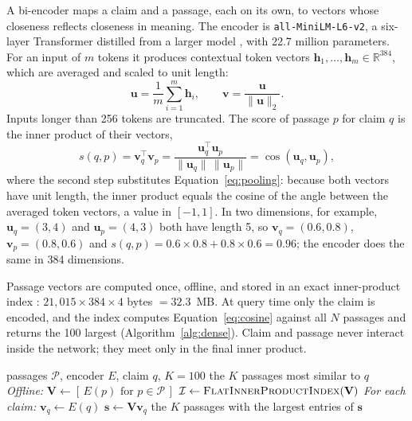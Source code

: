 A bi-encoder \parencite{reimers2019sbert} maps a claim and a passage, each on its own, to
vectors whose closeness reflects closeness in meaning. The encoder is \texttt{all-MiniLM-L6-v2},
a six-layer Transformer \parencite{vaswani2017attention} distilled from a larger model
\parencite{wang2020minilm}, with 22.7 million parameters. For an input of $m$ tokens it produces
contextual token vectors $\mathbf{h}_1, \dots, \mathbf{h}_m \in \mathbb{R}^{384}$, which are
averaged and scaled to unit length:
\begin{equation}
\mathbf{u} = \frac{1}{m} \sum_{i=1}^{m} \mathbf{h}_i,
\qquad
\mathbf{v} = \frac{\mathbf{u}}{\lVert \mathbf{u} \rVert_2}.
\label{eq:pooling}
\end{equation}
Inputs longer than 256 tokens are truncated. The score of passage $p$ for claim $q$ is the
inner product of their vectors,
\begin{equation}
s(q, p) = \mathbf{v}_q^{\top} \mathbf{v}_p
= \frac{\mathbf{u}_q^{\top} \mathbf{u}_p}{\lVert \mathbf{u}_q \rVert \, \lVert \mathbf{u}_p \rVert}
= \cos(\mathbf{u}_q, \mathbf{u}_p),
\label{eq:cosine}
\end{equation}
where the second step substitutes Equation~\eqref{eq:pooling}: because both vectors have unit
length, the inner product equals the cosine of the angle between the averaged token vectors, a
value in $[-1, 1]$. In two dimensions, for example, $\mathbf{u}_q = (3, 4)$ and
$\mathbf{u}_p = (4, 3)$ both have length 5, so $\mathbf{v}_q = (0.6, 0.8)$,
$\mathbf{v}_p = (0.8, 0.6)$ and $s(q, p) = 0.6 \times 0.8 + 0.8 \times 0.6 = 0.96$; the encoder
does the same in 384 dimensions.

Passage vectors are computed once, offline, and stored in an exact inner-product index
\parencite{johnson2021faiss}: $21{,}015 \times 384 \times 4$ bytes $= 32.3$~MB. At query time only
the claim is encoded, and the index computes Equation~\eqref{eq:cosine} against all $N$
passages and returns the 100 largest (Algorithm~\ref{alg:dense}). Claim and passage never
interact inside the network; they meet only in the final inner product.

\begin{algorithm}[t]
\caption{Dense indexing and search}
\label{alg:dense}
\begin{algorithmic}[1]
\Require passages $\mathcal{P}$, encoder $E$, claim $q$, $K = 100$
\Ensure the $K$ passages most similar to $q$
\Statex \textit{Offline:}
\State $\mathbf{V} \gets [\,E(p) \text{ for } p \in \mathcal{P}\,]$ 
\State $\mathcal{I} \gets \Call{FlatInnerProductIndex}{\mathbf{V}}$
\Statex \textit{For each claim:}
\State $\mathbf{v}_q \gets E(q)$
\State $\mathbf{s} \gets \mathbf{V}\mathbf{v}_q$ 
\State \Return the $K$ passages with the largest entries of $\mathbf{s}$
\end{algorithmic}
\end{algorithm}

